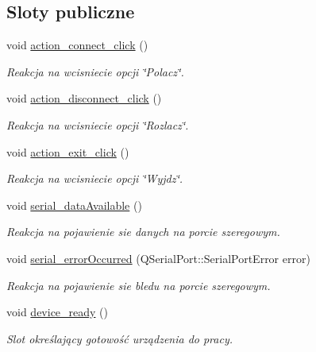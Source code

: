 \subsection*{Sloty publiczne}
\begin{DoxyCompactItemize}
\item 
void \hyperlink{class_main_window_a8ad6af79d8b18fa2ff69866afbe6ecc7}{action\+\_\+connect\+\_\+click} ()
\begin{DoxyCompactList}\small\item\em Reakcja na wcisniecie opcji \char`\"{}\+Polacz\char`\"{}. \end{DoxyCompactList}\item 
void \hyperlink{class_main_window_a4660903387809c38a5db5a2d4a0bc55e}{action\+\_\+disconnect\+\_\+click} ()
\begin{DoxyCompactList}\small\item\em Reakcja na wcisniecie opcji \char`\"{}\+Rozlacz\char`\"{}. \end{DoxyCompactList}\item 
void \hyperlink{class_main_window_a43f1250800036cd68a802a31f225fd9a}{action\+\_\+exit\+\_\+click} ()
\begin{DoxyCompactList}\small\item\em Reakcja na wcisniecie opcji \char`\"{}\+Wyjdz\char`\"{}. \end{DoxyCompactList}\item 
void \hyperlink{class_main_window_a8ef5ba3cc49d3b686953728b0f32ac25}{serial\+\_\+data\+Available} ()
\begin{DoxyCompactList}\small\item\em Reakcja na pojawienie sie danych na porcie szeregowym. \end{DoxyCompactList}\item 
void \hyperlink{class_main_window_a98049227c3d1ee766d9d2a85c057074e}{serial\+\_\+error\+Occurred} (Q\+Serial\+Port\+::\+Serial\+Port\+Error error)
\begin{DoxyCompactList}\small\item\em Reakcja na pojawienie sie bledu na porcie szeregowym. \end{DoxyCompactList}\item 
void \hyperlink{class_main_window_a979be71b9bb0355416aee2b4e3d664d4}{device\+\_\+ready} ()
\begin{DoxyCompactList}\small\item\em Slot określający gotowość urządzenia do pracy. \end{DoxyCompactList}\item 

\end{DoxyCompactItemize}
